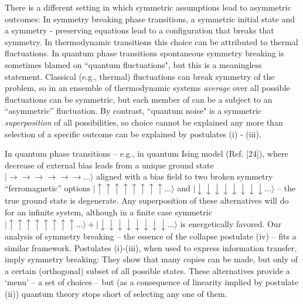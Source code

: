 \documentclass[aps,twocolumn,pra,onecolumn,12pt]{revtex4}
\newcommand{\ket}[1]    {| #1 \rangle}
\newcommand{\+}         {\dagger}
\begin{document}
There is a different setting in which symmetric assumptions lead to asymmetric outcomes: 
In symmetry breaking phase transitions, a symmetric initial state and a symmetry 
- preserving equations lead to a configuration that breaks that symmetry.  In 
thermodynamic transitions this choice can be attributed to thermal fluctuations. In quantum phase transitions spontaneous symmetry breaking is sometimes blamed on 
``quantum fluctuations", but this is a meaningless statement. Classical (e.g., thermal) fluctuations 
can break symmetry of the problem, so in an ensemble of thermodynamic systems {\it average} over 
all possible fluctuations can be symmetric, but each member of can be a subject to an ``asymmetric'' fluctuation. By contrast,  ``quantum noise" is a symmetric {\it superposition} of all possibilities, 
so choice cannot be explained any more than  selection of a specific 
outcome can be explained by postulates (i) - (iii). 

In quantum phase transitions -- e.g., in quantum Ising model (Ref. [24]), where decrease of external 
bias leads from a unique ground state $\ket {\rightarrow \rightarrow \rightarrow \rightarrow \rightarrow \rightarrow \dots}$ aligned with a bias field to two broken symmetry  ``ferromagnetic'' options 
$\ket{\uparrow \uparrow \uparrow \uparrow \uparrow \uparrow \uparrow \uparrow \dots}$ and $\ket{\downarrow \downarrow \downarrow \downarrow\downarrow \downarrow\downarrow \downarrow \dots} $ -- the true ground state is degenerate. Any superposition of these alternatives will do for an
infinite system, although in a finite case symmetric $\ket{\uparrow \uparrow \uparrow \uparrow \uparrow \uparrow \uparrow \uparrow \dots} + \ket {\downarrow \downarrow \downarrow \downarrow\downarrow \downarrow\downarrow \downarrow \dots} $ is energetically favored.
Our analysis of symmetry breaking -- the essence of the collapse postulate (iv) -- fits a similar 
framework. Postulates (i)-(iii), when used to express information transfer, imply symmetry breaking: 
They show that many copies can be made, but only of a certain (orthogonal) subset of all possible 
states. These alternatives provide a `menu' -- a set of choices -- but (as a consequence 
of linearity implied by postulate (ii)) quantum theory stops short of selecting any one of them.
\end{document}
